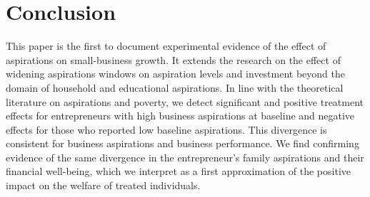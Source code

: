 \documentclass[11.5pt]{article}
\begin{document}

\section{Conclusion}\label{sec.conc}

This paper is the first to document experimental evidence of the effect of aspirations on small-business growth. It extends the research on the effect of widening aspirations windows on aspiration levels and investment beyond the domain of household and educational aspirations. In line with the theoretical literature on aspirations and poverty, we detect significant and positive treatment effects for entrepreneurs with high business aspirations at baseline and negative effects for those who reported low baseline aspirations. This divergence is consistent for business aspirations and business performance. We find confirming evidence of the same divergence in the entrepreneur's family aspirations and their financial well-being, which we interpret as a first approximation of the positive impact on the welfare of treated individuals.
\end{document}
